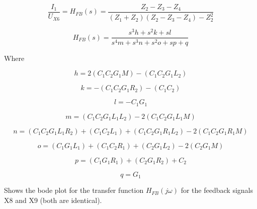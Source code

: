 \begin{equation} \label{eq:fb_1}
\frac{I_1}{U_{X6}} = H_{FB}(s) = \frac{Z_2-Z_3-Z_4}{(Z_1+Z_2)(Z_2-Z_3-Z_4)-Z_2^2}
\end{equation}

\begin{equation} \label{eq:fb_2}
    H_{FB}(s) = \frac{s^3 h + s^2 k + s l}{s^4 m + s^3 n + s^2 o + s p + q}
\end{equation}

Where

\begin{equation}
    h = 2(C_1 C_2 G_1 M) - (C_1 C_2 G_1 L_2)
\end{equation}

\begin{equation}
    k = -(C_1 C_2 G_1 R_2) - (C_1 C_2)
\end{equation}

\begin{equation}
    l = -C_1 G_1
\end{equation}

\begin{equation}
    m = (C_1 C_2 G_1 L_1 L_2)-2(C_1 C_2 G_1 L_1 M)
\end{equation}

\begin{equation} \label{eq:fb_n}
    n = (C_1 C_2 G_1 L_1 R_2) + (C_1 C_2 L_1) + (C_1 C_2 G_1 R_1 L_2) - 2(C_1 C_2 G_1 R_1 M)
\end{equation}

\begin{equation} \label{eq:fb_o}
    o = (C_1 G_1 L_1) + (C_1 C_2 R_1) + (C_2 G_1 L_2) -2(C_2 G_1 M)
\end{equation}

\begin{equation} \label{eq:fb_p}
    p = (C_1 G_1 R_1) + (C_2 G_1 R_2) + C_2
\end{equation}

\begin{equation} \label{eq:fb_q}
    q = G_1
\end{equation}

 Shows the bode plot for the transfer function $H_{FB}(j\omega)$ for the feedback signals X8 and X9 (both are identical).

